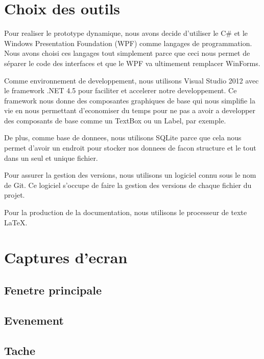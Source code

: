 \documentclass[letterpaper, oneside, 12pt, these, creativecommons]{thETS}
\begin{document}
\section{Choix des outils}

Pour realiser le prototype dynamique, nous avons decide d'utiliser le C\# et le Windows Presentation Foundation (WPF) comme langages de programmation. Nous avons choisi ces langages tout simplement parce que ceci nous permet de séparer le code des interfaces et que le WPF va ultimement remplacer WinForms. 

Comme environnement de developpement, nous utilisons Visual Studio 2012 avec le framework .NET 4.5 pour faciliter et accelerer notre developpement. Ce framework nous donne des composantes graphiques de base qui nous simplifie la vie en nous permettant d'economiser du temps pour ne pas a avoir a developper des composants de base comme un TextBox ou un Label, par exemple.

De plus, comme base de donnees, nous utilisons SQLite parce que cela nous permet d'avoir un endroit pour stocker nos donnees de facon structure et le tout dans un seul et unique fichier.

Pour assurer la gestion des versions, nous utilisons un logiciel connu sous le nom de Git. Ce logiciel s'occupe de faire la gestion des versions de chaque fichier du projet.

Pour la production de la documentation, nous utilisons le processeur de texte \LaTeX.

\newpage

\section{Captures d'ecran}

\subsection{Fenetre principale}

\newpage

\subsection{Evenement}

\newpage

\subsection{Tache}
\end{document}
